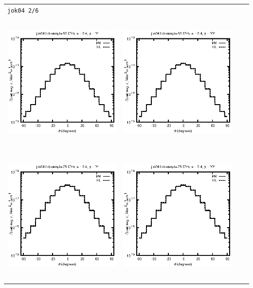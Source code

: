 \documentclass[10pt,a4paper]{article}
\begin{document}
\begin{adjustwidth}{-1.2in}{-1.2in}
\begin{tabular}{c c c c}
\multicolumn{4}{l}{\texttt{jok04 2/6}} \\
\includegraphics[height=7cm]{../eps/jok04_Ld_sample_50.00m_fwd.eps} &
\includegraphics[height=7cm]{../eps/jok04_Ld_sample_50.00m_cross.eps} \\
\includegraphics[height=7cm]{../eps/jok04_Ld_sample_75.00m_fwd.eps} &
\includegraphics[height=7cm]{../eps/jok04_Ld_sample_75.00m_cross.eps} \\

\end{tabular}
\end{adjustwidth}
\end{document}
